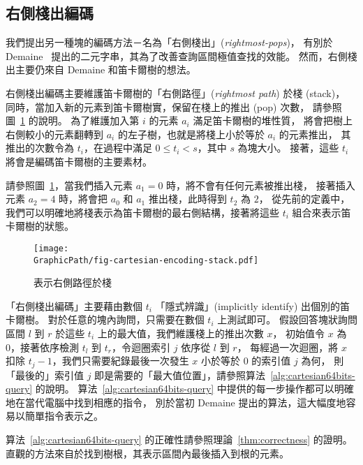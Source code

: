 \subsection{右側棧出編碼} \label{sec:cct}

我們提出另一種塊的編碼方法－名為「右側棧出」({\em rightmost-pops})，
有別於 Demaine~\cite{Demaine2009OnCT} 提出的二元字串，其為了改善查詢區間極值查找的效能。
然而，右側棧出主要仍來自 Demaine 和笛卡爾樹的想法。


右側棧出編碼主要維護笛卡爾樹的「右側路徑」({\em rightmost path}) 於棧 (stack)，
同時，當加入新的元素到笛卡爾樹實，保留在棧上的推出 (pop) 次數，
請參照圖~\ref{fig:interval-cartesian} 的說明。
為了維護加入第 $i$ 的元素 $a_i$ 滿足笛卡爾樹的堆性質，
將會把樹上右側較小的元素翻轉到 $a_i$ 的左子樹，也就是將棧上小於等於 $a_i$ 的元素推出，
其推出的次數令為 $t_i$，在過程中滿足 $0 \le t_i < s$，其中 $s$ 為塊大小。
接著，這些 $t_i$ 將會是編碼笛卡爾樹的主要素材。

請參照圖~\ref{fig:interval-cartesian}，當我們插入元素 $a_1 = 0$ 時，將不會有任何元素被推出棧，
接著插入元素 $a_2 = 4$ 時，將會把 $a_0$ 和 $a_1$ 推出棧，此時得到 $t_2$ 為 $2$，
從先前的定義中，我們可以明確地將棧表示為笛卡爾樹的最右側結構，接著將這些 $t_i$ 組合來表示笛卡爾樹的狀態。

\begin{figure}[!thb]
  \centering
  \texttt{[image: \\GraphicPath/fig-cartesian-encoding-stack.pdf]}
  \caption{表示右側路徑於棧}
  \label{fig:interval-cartesian}
\end{figure}

「右側棧出編碼」主要藉由數個 $t_i$ 「隱式辨識」(implicitly identify) 出個別的笛卡爾樹。
對於任意的塊內詢問，只需要在數個 $t_i$ 上測試即可。
假設回答塊狀詢問區間 $l$ 到 $r$ 於這些 $t_i$ 上的最大值，我們維護棧上的推出次數 $x$，
初始值令 $x$ 為 0，接著依序檢測 $t_l$ 到 $t_r$，令迴圈索引 $j$ 依序從 $l$ 到 $r$，
每經過一次迴圈，將 $x$ 扣除 $t_j - 1$，我們只需要紀錄最後一次發生 $x$ 小於等於 0 的索引值 $j$ 為何，
則「最後的」索引值 $j$ 即是需要的「最大值位置」，請參照算法~\ref{alg:cartesian64bits-query} 的說明。
算法~\ref{alg:cartesian64bits-query} 中提供的每一步操作都可以明確地在當代電腦中找到相應的指令，
別於當初 Demaine 提出的算法，這大幅度地容易以簡單指令表示之。



算法~\ref{alg:cartesian64bits-query} 的正確性請參照理論~\ref{thm:correctness} 的證明。
直觀的方法來自於找到樹根，其表示區間內最後插入到根的元素。

